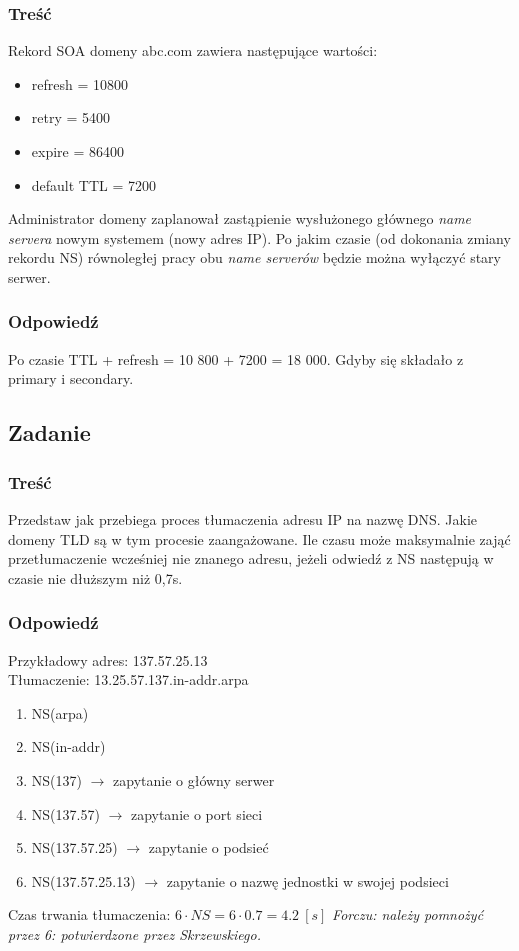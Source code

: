 		\subsubsection{Treść}
			Rekord SOA domeny abc.com zawiera następujące wartości:
			\begin{itemize}
				\item refresh = 10800
				\item retry = 5400
				\item expire = 86400
				\item default TTL = 7200
			\end{itemize}
			Administrator domeny zaplanował zastąpienie wysłużonego głównego \emph{name servera} nowym systemem (nowy adres IP). Po jakim czasie (od dokonania zmiany rekordu NS) równoległej pracy obu \emph{name serverów} będzie można wyłączyć stary serwer.
		\subsubsection{Odpowiedź}	
			Po czasie TTL + refresh = 10 800 + 7200 = 18 000. Gdyby się składało z primary i secondary.
\newpage
	\subsection{Zadanie}
		\subsubsection{Treść}
			Przedstaw jak przebiega proces tłumaczenia adresu IP na nazwę DNS. Jakie domeny TLD są w tym procesie zaangażowane. Ile czasu może maksymalnie zająć przetłumaczenie wcześniej nie znanego adresu, jeżeli odwiedź z NS następują w czasie nie dłuższym niż 0,7s.
		\subsubsection{Odpowiedź}
			Przykładowy adres: 137.57.25.13\\
			Tłumaczenie: 13.25.57.137.in-addr.arpa
			\begin{enumerate}
				\item NS(arpa)
				\item NS(in-addr)
				\item NS(137) $ \rightarrow $ zapytanie o główny serwer
				\item NS(137.57) $ \rightarrow $ zapytanie o port sieci
				\item NS(137.57.25) $ \rightarrow $ zapytanie o podsieć
				\item NS(137.57.25.13) $ \rightarrow $ zapytanie o nazwę jednostki w swojej podsieci
			\end{enumerate}
			Czas trwania tłumaczenia: $ 6\cdot NS=6\cdot0.7=4.2\:[s] $
			{\small \emph{Forczu: należy pomnożyć przez 6: potwierdzone przez Skrzewskiego.}}
			
